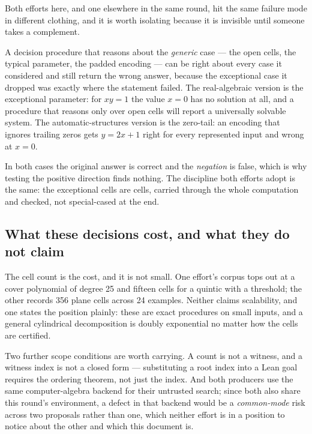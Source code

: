 Both efforts here, and one elsewhere in the same round, hit the same failure
mode in different clothing, and it is worth isolating because it is invisible
until someone takes a complement.

A decision procedure that reasons about the \emph{generic} case --- the open
cells, the typical parameter, the padded encoding --- can be right about every
case it considered and still return the wrong answer, because the exceptional
case it dropped was exactly where the statement failed. The real-algebraic
version is the exceptional parameter: for $xy=1$ the value $x=0$ has no
solution at all, and a procedure that reasons only over open cells will report a
universally solvable system. The automatic-structures version is the zero-tail:
an encoding that ignores trailing zeros gets $y=2x+1$ right for every
represented input and wrong at $x=0$.

In both cases the original answer is correct and the \emph{negation} is false,
which is why testing the positive direction finds nothing. The discipline both
efforts adopt is the same: the exceptional cells are cells, carried through the
whole computation and checked, not special-cased at the end.

\subsection{What these decisions cost, and what they do not claim}

The cell count is the cost, and it is not small. One effort's corpus tops out
at a cover polynomial of degree 25 and fifteen cells for a quintic with a
threshold; the other records 356 plane cells across 24 examples. Neither claims
scalability, and one states the position plainly: these are exact procedures on
small inputs, and a general cylindrical decomposition is doubly exponential no
matter how the cells are certified.

Two further scope conditions are worth carrying. A count is not a witness, and
a witness index is not a closed form --- substituting a root index into a Lean
goal requires the ordering theorem, not just the index. And both producers use
the same computer-algebra backend for their untrusted search; since both also
share this round's environment, a defect in that backend would be a
\emph{common-mode} risk across two proposals rather than one, which neither
effort is in a position to notice about the other and which this document is.
